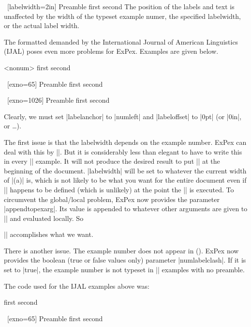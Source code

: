 \pex~[labelwidth=2in]
Preamble
\a first
\a[label=bb] second
\xe
The position of the labels and text is unaffected by the
width of the typeset example numer, the specified labelwidth, or
the actual label width.
\endgroup

The formatted demanded by the International Journal of American
Linguistics (IJAL) poses even more problems for ExPex.  Examples
are given below.

\begingroup
{}
\pex<nonum>
\a first
\a second
\xe

\pex~[exno=65]
Preamble
\a first
\a second
\xe

\pex~[exno=1026]
Preamble
\a first
\a second
\xe

Clearly, we must set |labelanchor| to |numleft| and |labeloffset|
to |0pt| (or |0in|, or \dots).

The first issue is that the labelwidth depends
on the example number.
ExPex can deal with this by |\pex[samplelabel=(\actualexno
a)]|.  But it is considerably less than elegant to
have to write this in every |\pex| example.  It will not produce
the desired result to put ||
at the beginning of the document.  |labelwidth| will be set to
whatever the current width of |(\actualexno a)| is, which is
not likely to be what you want for the entire document even if
|\actualexno| happens to be defined (which is unlikely) at the
point the |\lingset| is executed.  To circumvent the global/local
problem, ExPex now provides the parameter |appendtopexarg|.  Its
value is appended to whatever other arguments are given to
|\pex| and evaluated locally.  So\smallskip

||\smallskip
\noindent accomplishes what we
want.

There is another issue.  The example number does not appear in
().  ExPex now provides the boolean (true or false
values only) parameter |numlabelclash|.  If it is set to |true|,
the example number is not typeset in |\pex| examples with no
preamble.

The code used for the IJAL examples above was:
\codedisplay
{}

\pex
\a first
\a second
\xe

\pex~[exno=65]
Preamble
\a first
\a second
\xe

